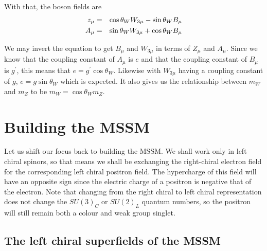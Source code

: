   With that, the boson fields are
  \begin{eqnarray}
    z_\mu &=& \cos\theta_W W_{3\mu} - \sin\theta_W B_\mu \nonumber \\
    A_\mu &=& \sin\theta_W W_{3\mu} + \cos\theta_W B_\mu \nonumber
  \end{eqnarray}

  We may invert the equation to get $B_\mu$ and $W_{3\mu}$ in terms of $Z_\mu$ and $A_\mu$. Since we know that the coupling constant of $A_\mu$ is $e$ and that the coupling constant of $B_\mu$ is $g^\prime$, this means that $e = g^\prime \cos\theta_W$. Likewise with $W_{3\mu}$ having a coupling constant of $g$, $e = g \sin\theta_W$ which is expected. It also gives us the relationship between $m_W$ and $m_Z$ to be $m_W = \cos \theta_W m_Z$.


\section{Building the MSSM}
\label{ch:15:building the MSSM}
Let us shift our focus back to building the MSSM. We shall work only in left chiral spinors, so that means we shall be exchanging the right-chiral electron field for the corresponding left chiral positron field. The hypercharge of this field will have an opposite sign since the electric charge of a positron is negative that of the electron. Note that changing from the right chiral to left chiral representation does not change the $SU(3)_C$ or $SU(2)_L$ quantum numbers, so the positron will still remain both a colour and weak group singlet.

  \subsection{The left chiral superfields of the MSSM}
  \label{ch:15:building the MSSM:left chiral superfields}

